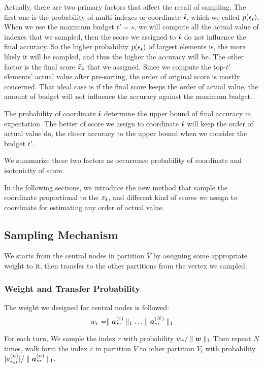 \documentclass[letterpaper]{article}
\newcommand{\Sca}[3]{{#1}^{(#2)}_{i_#2#3}}%
\newcommand{\V}[1]{{\bm{{\MakeLowercase{#1}}}}}
\newcommand{\Vacol}[1]{\V{a}^{(#1)}_{*r}}
\newcommand{\norm}[2]{\parallel#1\parallel_{#2}}
\begin{document}
Actually, there are two primary factors that affect the recall of sampling. The first one is the probability of multi-indexes or coordinate $\V{i}$, which we called $p(\epsilon_{\V{i}})$. When we use the maximum budget $t'=s$, we will compute all the actual value of indexes that we sampled, then the score we assigned to $\V{i}$ do not influence the final accuracy. So the higher probability $p(\epsilon_{\V{i}})$ of largest elements is, the more likely it will be sampled, and thus the higher the accuracy will be. The other factor is the final score $\widehat{x}_{\V{i}}$ that we assigned. Since we compute the top-$t'$ elements' actual value after pre-sorting, the order of original score is mostly concerned. That ideal case is if the final score keeps the order of actual value, the amount of budget will not influence the accuracy against the maximum budget.

The probability of coordinate $\V{i}$ determine the upper bound of final accuracy in expectation. The better of score we assign to coordinate $\V{i}$ will keep the order of actual value do, the closer accuracy to the upper bound when we consider the budget $t'$.

We summarize these two factors as occurrence probability of coordinate and isotonicity of score. 

In the following sections, we introduce the new method that sample the coordinate proportional to the $x_{\V{i}}$, and different kind of scores we assign to coordinate for estimating any order of actual value. 

\subsection{Sampling Mechanism}

We starts from the central nodes in partition $\overline{V}$ by assigning some appropriate weight to it, then transfer to the other partitions from the vertex we sampled.

\subsubsection{Weight and Transfer Probability}

The weight we designed for central nodes is followed:
\[
    w_r = \norm{\Vacol{1}}{1}\ldots\norm{\Vacol{N}}{1}
\]

For each turn, We sample the index $r$ with probability $w_r/\norm{\V{w}}{1}$.Then repeat $N$ times, walk form the index $r$ in partition $\overline{V}$ to other partition $V_i$ with probability $|\Sca{a}{n}{r}|/\norm{\Vacol{n}}{1}$.
\end{document}
